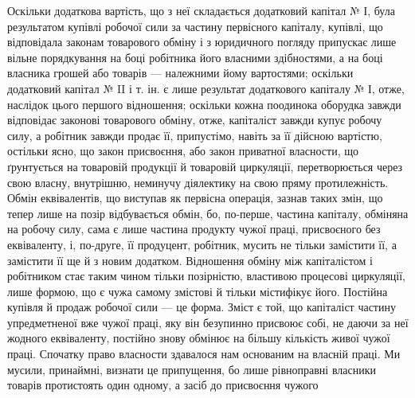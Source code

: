Оскільки додаткова вартість, що з неї складається додатковий
капітал № І, була результатом купівлі робочої сили за частину
первісного капіталу, купівлі, що відповідала законам товарового
обміну і з юридичного погляду припускає лише вільне порядкування
на боці робітника його власними здібностями, а на боці
власника грошей або товарів — належними йому вартостями;
оскільки додатковий капітал № II і т. ін. є лише результат додаткового
капіталу № І, отже, наслідок цього першого відношення;
оскільки кожна поодинока оборудка завжди відповідає
законові товарового обміну, отже, капіталіст завжди купує
робочу силу, а робітник завжди продає її, припустімо, навіть
за її дійсною вартістю, остільки ясно, що закон присвоєння, або
закон приватної власности, що ґрунтується на товаровій продукції
й товаровій циркуляції, перетворюється через свою власну,
внутрішню, неминучу діялектику на свою пряму протилежність.
Обмін еквівалентів, що виступав як первісна операція, зазнав
таких змін, що тепер лише на позір відбувається обмін, бо, по-перше,
частина капіталу, обміняна на робочу силу, сама є лише
частина продукту чужої праці, присвоєного без еквіваленту, і,
по-друге, її продуцент, робітник, мусить не тільки замістити її,
а замістити її ще й з новим додатком. Відношення обміну між
капіталістом і робітником стає таким чином тільки позірністю,
властивою процесові циркуляції, лише формою, що є чужа самому
змістові й тільки містифікує його. Постійна купівля й продаж
робочої сили — це форма. Зміст є той, що капіталіст частину
упредметненої вже чужої праці, яку він безупинно присвоює
собі, не даючи за неї жодного еквіваленту, постійно знову обмінює
на більшу кількість живої чужої праці. Спочатку право
власности здавалося нам основаним на власній праці. Ми мусили,
принаймні, визнати це припущення, бо лише рівноправні власники
товарів протистоять один одному, а засіб до присвоєння чужого
\parbreak{}  %
